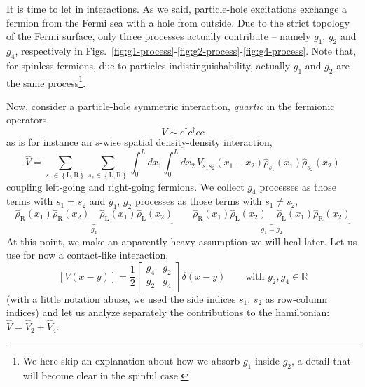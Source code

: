 It is time to let in interactions. As we said, particle-hole excitations exchange a fermion from the Fermi sea with a hole from outside. Due to the strict topology of the Fermi surface, only three processes actually contribute -- namely $g_1$, $g_2$ and $g_4$, respectively in Figs.~\ref{fig:g1-process}-\ref{fig:g2-process}-\ref{fig:g4-process}. Note that, for spinless fermions, due to particles indistinguishability, actually $g_1$ and $g_2$ are the same process\footnote{
	We here skip an explanation about how we absorb $g_1$ inside $g_2$, a detail that will become clear in the spinful case.
}.

Now, consider a particle-hole symmetric interaction, \textit{quartic} in the fermionic operators,
\[
	V \sim c^\dagger c^\dagger c c
\]
as is for instance an $s$-wise spatial density-density interaction,
\[
	\hat V = \sum_{s_1 \in \left\{\mathrm L, \mathrm R\right\}} \sum_{s_2 \in \left\{\mathrm L, \mathrm R\right\}} \int_0^L dx_1 \int_0^L dx_2 \, V_{s_1 s_2}(x_1-x_2) \hat \rho_{s_1}(x_1) \hat \rho_{s_2} (x_2)
\]
coupling left-going and right-going fermions. We collect $g_4$ processes as those terms with $s_1 = s_2$ and $g_1$, $g_2$ processes as those terms with $s_1 \neq s_2$,
\[
	\underbrace{\hat \rho_\mathrm{R} (x_1) \hat \rho_\mathrm{R} (x_2) \quad \hat \rho_\mathrm{L} (x_1) \hat \rho_\mathrm{L} (x_2)}_{g_4} \qquad \underbrace{\hat \rho_\mathrm{R} (x_1) \hat \rho_\mathrm{L} (x_2) \quad \hat \rho_\mathrm{L} (x_1) \hat \rho_\mathrm{R} (x_2)}_{g_1 = g_2}
\]
At this point, we make an apparently heavy assumption we will heal later. Let us use for now a contact-like interaction,
\[
	\left[V(x-y)\right] = \frac{1}{2} \begin{bmatrix}
		g_4 & g_2 \\ g_2 & g_4
	\end{bmatrix} \delta(x-y)
	\qquad
	\text{with $g_2, g_4 \in \mathbb{R}$}
\]
(with a little notation abuse, we used the side indices $s_1$, $s_2$ as row-column indices) and let us analyze separately the contributions to the hamiltonian: $\hat V = \hat V_2 + \hat V_4$.

